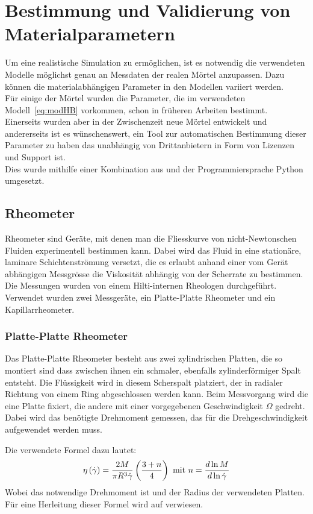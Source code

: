 \section{Bestimmung und Validierung von Materialparametern}
\label{Kapitel:Parameter}
Um eine realistische Simulation zu ermöglichen, ist es notwendig die verwendeten Modelle möglichst genau an Messdaten der realen Mörtel anzupassen. Dazu können die materialabhängigen Parameter in den Modellen variiert werden.\\
Für einige der Mörtel wurden die Parameter, die im verwendeten Modell~\eqref{eq:modHB} vorkommen, schon in früheren Arbeiten bestimmt. \\
Einerseits wurden aber in der Zwischenzeit neue Mörtel entwickelt und andererseits ist es wünschenswert, ein Tool zur automatischen Bestimmung dieser Parameter zu haben das unabhängig von Drittanbietern in Form von Lizenzen und Support ist. \\
Dies wurde mithilfe einer Kombination aus \openfoam{} und der Programmiersprache Python umgesetzt.
%
\subsection{Rheometer}
Rheometer sind Geräte, mit denen man die Fliesskurve von nicht-Newtonschen Fluiden experimentell bestimmen kann.
Dabei wird das Fluid in eine stationäre, laminare Schichtenströmung versetzt, die es erlaubt anhand einer vom Gerät abhängigen Messgrösse die Viskosität abhängig von der Scherrate zu bestimmen.
Die Messungen wurden von einem Hilti-internen Rheologen durchgeführt. Verwendet wurden zwei Messgeräte, ein Platte-Platte Rheometer und ein Kapillarrheometer.
%
\subsubsection{Platte-Platte Rheometer}
\label{Kapitel:Parameter:PlattePlatteRheo}
Das Platte-Platte Rheometer besteht aus zwei zylindrischen Platten, die so montiert sind dass zwischen ihnen ein schmaler, ebenfalls zylinderförmiger Spalt entsteht. 
Die Flüssigkeit wird in diesem Scherspalt platziert, der in radialer Richtung von einem Ring abgeschlossen werden kann. Beim Messvorgang wird die eine Platte fixiert, die andere mit einer vorgegebenen Geschwindigkeit $\Omega$ gedreht.
Dabei wird das benötigte Drehmoment gemessen, das für die Drehgeschwindigkeit aufgewendet werden muss.

Die verwendete Formel dazu lautet:
\begin{equation}
    \label{eq:platterheovisko}
    \eta\left( \dot\gamma \right) = \frac{2M}{\pi R^3 \dot\gamma}\left( \frac{3+n}{4} \right) \text{ mit } n=\frac{d\ln M}{d\ln\dot\gamma}
\end{equation}
Wobei  das notwendige Drehmoment ist und  der Radius der verwendeten Platten.
Für eine Herleitung dieser Formel wird auf \cite{introtorheo} verwiesen.

